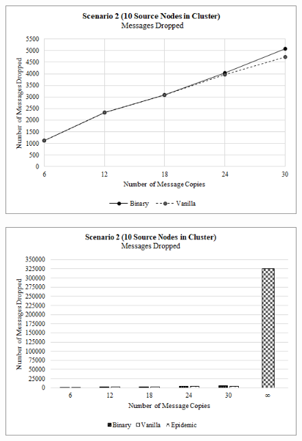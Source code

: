 \documentclass{article}
\begin{document}
\begin{figure}[h!]
\centering
\begin{minipage}[t]{.5\textwidth}
  \centering
  \includegraphics[width=.98\linewidth]{Results/Graphs/MessagesDropped/S2_MessagesDropped_SprayAndWaitComparison.png}
  \label{fig:test1}
\end{minipage}%
\begin{minipage}[t]{.5\textwidth}
  \centering
  \includegraphics[width=.98\linewidth]{Results/Graphs/MessagesDropped/S2_MessagesDropped_AllComparison.png}
  \label{fig:test2}
\end{minipage}

\end{figure}
\end{document}
